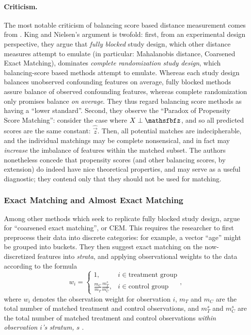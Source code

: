 \documentclass[11pt]{extarticle}
\begin{document}
\paragraph{Criticism.} The most notable criticism of balancing score based distance measurement comes from \textcite{king_why_2019}. King and Nielsen's argument is twofold: first, from an experimental design perspective, they argue that \emph{fully blocked} study design, which other distance measures attempt to emulate (in particular: Mahalanobis distance, Coarsened Exact Matching), dominates \emph{complete randomization study design}, which balancing-score based methods attempt to emulate.
Whereas each study design balances unobserved confounding features on average, fully blocked methods assure balance of observed confounding features, whereas complete randomization only promises balance \emph{on average}.
They thus regard balancing score methods as having a ``lower standard''.
Second, they observe the ``Paradox of Propensity Score Matching'': consider the case where $\mat{X} \perp \vec{z}$, and so all predicted scores are the same constant: $\hat{\vec{z}}$.
Then, all potential matches are indecipherable, and the individual matchings may be complete nonsensical, and in fact may \emph{increase} the imbalance of features within the matched subset. The authors nonetheless concede that propensity scores (and other balancing scores, by extension) do indeed have nice theoretical properties, and may serve as a useful diagnostic; they contend only that they should not be used for matching.

\subsubsection{Exact Matching and Almost Exact Matching}
\label{subsubsec:exactmatching}

Among other methods which seek to replicate fully blocked study design, \textcite{king_why_2019} argue for ``coarsened exact matching'', or CEM. This requires the researcher to first preprocess their data into discrete categories: for example, a vector ``age'' might be grouped into buckets. They then suggest exact matching on the now-discretized features into \emph{strata}, and applying observational weights to the data according to the formula
\begin{equation}
  w_{i}= \begin{cases}1, & i \in \text{treatment group} \\ \frac{m_{C}}{m_{T}} \frac{m_{T}^{s}}{m_{C}^{s}}, & i \in \text{control group} \end{cases},
\end{equation}
where $w_i$ denotes the observation weight for observation $i$, $m_T$ and $m_C$ are the total number of matched treatment and control observations, and $m_T^s$ and $m_C^s$ are the total number of matched treatment and control observations \emph{within observation $i$'s stratum, $s$} \parencite{iacus_causal_2012}.
\end{document}
